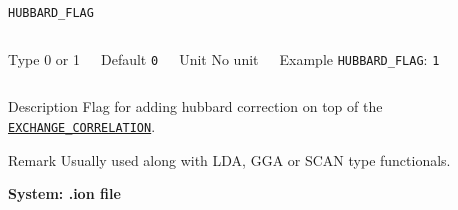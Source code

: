 \begin{frame}[allowframebreaks]{\texttt{HUBBARD\_FLAG}} \label{HUBBARD_FLAG}
\vspace*{-12pt}
\begin{columns}
\begin{block}{Type}
0 or 1
\end{block}

\begin{block}{Default}
\texttt{0}
\end{block}

\begin{block}{Unit}
No unit
\end{block}

\begin{block}{Example}
\texttt{HUBBARD\_FLAG}: \texttt{1}
\end{block}
\end{columns}

\begin{block}{Description}
Flag for adding hubbard correction on top of the \hyperlink{EXCHANGE_CORRELATION}{\texttt{EXCHANGE\_CORRELATION}}.
\end{block}

\begin{block}{Remark}
Usually used along with LDA, GGA or SCAN type functionals.
\end{block}

\end{frame}


\begin{frame}[allowframebreaks,c]{} \label{System:ion}

\begin{center}
\Huge \textbf{System: .ion file}
\end{center}

\end{frame}

